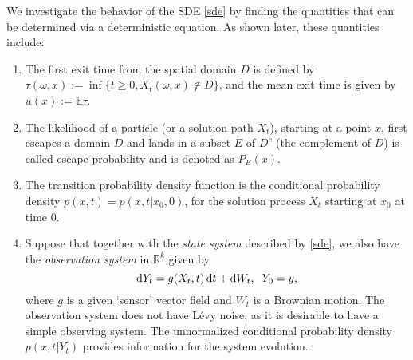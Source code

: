 \documentclass[11pt]{article}
\newcommand{\om}{\omega}
\newcommand{\R}{{\mathbb R}}
\newcommand{\EX}{\mathbb{E}}
\begin{document}
We investigate the behavior of the SDE \eqref{sde} by finding
the quantities that can be determined via a deterministic equation.
As shown later, these quantities include:
\begin{enumerate}
\item The first exit time from the spatial domain $D$  is defined by
$\displaystyle
\tau (\omega, x):= \inf \{t \geq 0, X_{t}(\om, x)  \notin D \}$,
and the mean exit time is given by $u(x) := \EX \tau$.
\item The likelihood of a particle (or a solution path $X_t$), starting at a point $x$,
first escapes a domain $D$ and lands
in a subset $E$ of $D^c$ (the complement of $D$) is called escape probability and is denoted as $P_E(x)$.
\item  The transition probability density function
is    the conditional probability
density $p(x,t) = p(x, t|x_0, 0)$,  for the solution
process $X_t$  starting at $x_0$ at time $0$.
\item Suppose that together with the {\em state system}
described by \eqref{sde}, we also have the {\em observation system} in $\R^k$ given
by
\begin{equation} \label{observe3}
{\rm d}Y_t = g(X_t, t)\,{\rm d}t + {\rm d} W_t, \;\;   Y_0=y,
\end{equation}
where $g$ is a given `sensor'  vector field and $W_t$ is a Brownian motion. The observation system does not have L\'evy noise, as it is desirable to have a simple observing system.
The unnormalized conditional probability density
$p(x, t|Y_t)$ provides information for the system evolution.
\end{enumerate}
\end{document}
